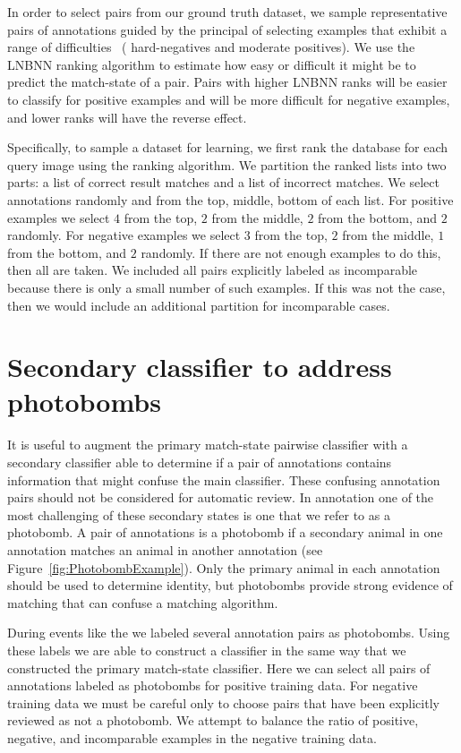 In order to select pairs from our ground truth dataset, we sample representative pairs of annotations guided by
  the principal of selecting examples that exhibit a range of difficulties~\cite{shi_embedding_2016} (\eg
  hard-negatives and moderate positives).
We use the LNBNN ranking algorithm to estimate how easy or difficult it might be to predict the match-state of a
  pair.
Pairs with higher LNBNN ranks will be easier to classify for positive examples and will be more difficult for
  negative examples, and lower ranks will have the reverse effect.

Specifically, to sample a dataset for learning, we first rank the database for each query image using the ranking
  algorithm.
We partition the ranked lists into two parts:
a list of correct result matches and a list of incorrect matches.
We select annotations randomly and from the top, middle, bottom of each list.
For positive examples we select $4$ from the top, $2$ from the middle, $2$ from the bottom, and $2$ randomly.
For negative examples we select $3$ from the top, $2$ from the middle, $1$ from the bottom, and $2$ randomly.
If there are not enough examples to do this, then all are taken.
We included all pairs explicitly labeled as incomparable because there is only a small number of such examples.
If this was not the case, then we would include an additional partition for incomparable cases.


\section{Secondary classifier to address photobombs}\label{sec:learnpb}
    It is useful to augment the primary match-state pairwise classifier with a secondary classifier able to
      determine if a pair of annotations contains information that might confuse the main classifier.
    These confusing annotation pairs should not be considered for automatic review.
    In annotation one of the most challenging of these secondary states is one that we refer to as a {photobomb}.
    A pair of annotations is a photobomb if a secondary animal in one annotation matches an animal in another
      annotation (\eg see Figure~\ref{fig:PhotobombExample}).
    Only the primary animal in each annotation should be used to determine identity, but photobombs provide
      strong evidence of matching that can confuse a matching algorithm.

    \PhotobombExample{}

    During events like the \GZC{} we labeled several annotation pairs as photobombs.
    Using these labels we are able to construct a classifier in the same way that we constructed the primary
      match-state classifier.
    Here we can select all pairs of annotations labeled as photobombs for positive training data.
    For negative training data we must be careful only to choose pairs that have been explicitly reviewed as not
      a photobomb.
    We attempt to balance the ratio of positive, negative, and incomparable examples in the negative training
      data.

